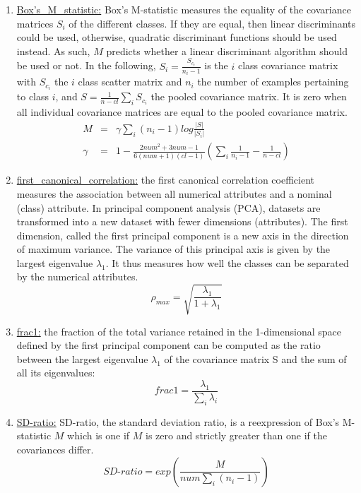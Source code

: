 \documentclass[a4paper,12pt, english]{article}
\begin{document}
\begin{enumerate}
\begin{enumerate}
\begin{enumerate}
\begin{enumerate}
\begin{enumerate}
\begin{enumerate}
				\item \underline{Box's\_M\_statistic:} Box's M-statistic measures the equality of the covariance matrices $S_{i}$ of the different classes. If they are equal, then linear discriminants could be used, otherwise, quadratic discriminant functions should be used instead. As such, $M$ predicts whether a linear discriminant algorithm should be used or not. In the following, $S_{i}=\frac{S_{c_{i}}}{n_{i}-1}$ is the $i$ class covariance matrix with $S_{c_{i}}$ the $i$ class scatter matrix and $n_{i}$ the number of examples pertaining to class $i$, and $S=\frac{1}{n-cl}\sum_{i}S_{c_{i}}$ the pooled covariance matrix. It is zero when all individual covariance matrices are equal to the pooled covariance matrix. \begin{eqnarray} M&=&\gamma\sum_{i}(n_{i}-1)log\frac{|S|}{|S_{i}|} \\ \gamma&=&1-\frac{2num^{2}+3num-1}{6(num+1)(cl-1)}(\sum_{i}\frac{1}{n_{i}-1}-\frac{1}{n-cl}) \end{eqnarray}
				\item \underline{first\_canonical\_correlation:}  the first canonical correlation coefficient measures the association between all numerical attributes and a nominal (class) attribute. In principal component analysis (PCA), datasets are transformed into a new dataset with fewer dimensions (attributes). The first dimension, called the first principal component is a new axis in the direction of maximum variance. The variance of this principal axis is given by the largest eigenvalue $\lambda_{1}$. It thus measures how well the classes can be separated by the numerical attributes. \begin{equation} \rho_{max}=\sqrt{\frac{\lambda_{1}}{1+\lambda_{1}}} \end{equation}
				\item \underline{frac1:} the fraction of the total variance retained in the 1-dimensional space defined by the first principal component can be computed as the ratio between the largest eigenvalue $\lambda_{1}$ of the covariance matrix S and the sum of all its eigenvalues: \begin{equation} frac1=\frac{\lambda_{1}}{\sum_{i}\lambda_{i}} \end{equation}
				\item \underline{SD-ratio:} SD-ratio, the standard deviation ratio, is a reexpression of Box's M-statistic $M$ which is one if $M$ is zero and strictly greater than one if the covariances differ. \begin{equation} SD\mbox{-}ratio=exp(\frac{M}{num\sum_{i}(n_{i}-1)}) \end{equation}

\end{enumerate}
\end{enumerate}
\end{enumerate}
\end{enumerate}
\end{enumerate}
\end{enumerate}
\end{document}

